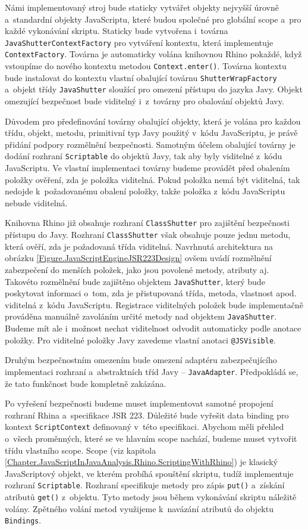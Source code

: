 Námi implementovaný stroj bude staticky vytvářet objekty nejvyšší úrovně a~standardní objekty JavaScriptu, které budou společné pro globální scope a~pro každé vykonávání skriptu. Staticky bude vytvořena i~továrna \texttt{JavaShutterContextFactory} pro vytváření kontextu, která implementuje \texttt{ContextFactory}. Továrna je automaticky volána knihovnou Rhino pokaždé, když vstoupíme do nového kontextu metodou \texttt{Context.enter()}. Továrna kontextu bude instalovat do kontextu vlastní obalující továrnu \texttt{ShutterWrapFactory} a~objekt třídy \texttt{JavaShutter} sloužící pro omezení přístupu do jazyka Javy. Objekt omezující bezpečnost bude viditelný i~z~továrny pro obalování objektů Javy.

Důvodem pro předefinování továrny obalující objekty, která je volána pro každou třídu, objekt, metodu, primitivní typ Javy použitý v~kódu JavaScriptu, je právě přidání podpory rozmělnění bezpečnosti. Samotným účelem obalující továrny je dodání rozhraní \texttt{Scriptable} do objektů Javy, tak aby byly viditelné z~kódu JavaScriptu. Ve vlastní implementaci továrny budeme provádět před obalením položky ověření, zda je položka viditelná. Pokud položka nemá být viditelná, tak nedojde k~požadovanému obalení položky, takže položka z~kódu JavaScriptu nebude viditelná.

Knihovna Rhino již obsahuje rozhraní \texttt{ClassShutter} pro zajištění bezpečnosti přístupu do Javy. Rozhraní \texttt{ClassShutter} však obsahuje pouze jednu metodu, která ověří, zda je požadovaná třída viditelná. Navrhnutá architektura na obrázku \ref{Figure.JavaScriptEngineJSR223Design} ovšem uvádí rozmělnění zabezpečení do menších položek, jako jsou povolené metody, atributy aj. Takovéto rozmělnění bude zajištěno objektem \texttt{JavaShutter}, který bude poskytovat informaci o~tom, zda je přistupovaná třída, metoda, vlastnost apod. viditelná z~kódu JavaScriptu. Registrace viditelných položek bude implementačně prováděna manuálně zavoláním určité metody nad objektem \texttt{JavaShutter}. Budeme mít ale i~možnost nechat viditelnost odvodit automaticky podle anotace položky. Pro viditelné položky Javy zavedeme vlastní anotaci \texttt{@JSVisible}. 

Druhým bezpečnostním omezením bude omezení adaptéru zabezpečujícího implementaci rozhraní a~abstraktních tříd Javy -- \texttt{JavaAdapter}. Předpokládá se, že tato funkčnost bude kompletně zakázána.

Po vyřešení bezpečnosti budeme muset implementovat samotné propojení rozhraní Rhina a~specifikace JSR 223. Důležité bude vyřešit data binding pro kontext \texttt{ScriptContext} definovaný v~této specifikaci. Abychom měli přehled o~všech proměnných, které se ve hlavním scope  nachází, budeme muset vytvořit třídu vlastního scope. Scope (viz kapitola \ref{Chapter.JavaScriptInJavaAnalysis.Rhino.ScriptingWithRhino}) je klasický JavaScriptový objekt, ve kterém probíhá spouštění skriptu, tudíž implementuje rozhraní \texttt{Scriptable}. Rozhraní specifikuje metody pro zápis \texttt{put()} a~získání atributů \texttt{get()} z~objektu. Tyto metody jsou během vykonávání skriptu náležitě volány. Zpětného volání metod využijeme k~navázání atributů do objektu \texttt{Bindings}.

